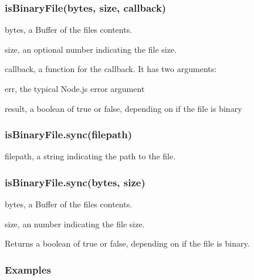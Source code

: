 \subsubsection*{is\+Binary\+File(bytes, size, callback)}


\begin{DoxyItemize}
\item {\ttfamily bytes}, a {\ttfamily Buffer} of the file\textquotesingle{}s contents.
\item {\ttfamily size}, an optional {\ttfamily number} indicating the file size.
\item {\ttfamily callback}, a {\ttfamily function} for the callback. It has two arguments\+:
\begin{DoxyItemize}
\item {\ttfamily err}, the typical Node.\+js error argument
\item {\ttfamily result}, a {\ttfamily boolean} of {\ttfamily true} or {\ttfamily false}, depending on if the file is binary
\end{DoxyItemize}
\end{DoxyItemize}

\subsubsection*{is\+Binary\+File.\+sync(filepath)}


\begin{DoxyItemize}
\item {\ttfamily filepath}, a {\ttfamily string} indicating the path to the file.
\end{DoxyItemize}

\subsubsection*{is\+Binary\+File.\+sync(bytes, size)}


\begin{DoxyItemize}
\item {\ttfamily bytes}, a {\ttfamily Buffer} of the file\textquotesingle{}s contents.
\item {\ttfamily size}, an {\ttfamily number} indicating the file size.
\end{DoxyItemize}

Returns a {\ttfamily boolean} of {\ttfamily true} or {\ttfamily false}, depending on if the file is binary.

\subsubsection*{Examples}


